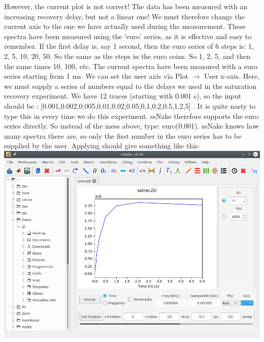 \documentclass[11pt,a4paper]{article}
\begin{document}
However, the  current plot is not correct! The data has been measured with an increasing recovery
delay, but not a linear one! We must therefore change the current axis to the one we have actually
used during the measurement. These spectra have been measured using the `euro' series, as it is
effective and easy to remember. If the first delay is, say 1 second, then the euro series of 6 steps
is: 1, 2, 5, 10, 20, 50. So the same as the steps in the euro coins. So 1, 2, 5, and then the same
times 10, 100, etc. The current spectra have been measured with a euro series starting from 1 ms. We
can set the user axis via Plot $\rightarrow$ User x-axis. Here, we must supply a series of numbers
equal to the delays we used in the saturation recovery experiment. We have 12 traces (starting with
0.001 s), so the input should be : [0.001,0.002,0.005,0.01,0.02,0.05,0.1,0.2,0.5,1,2,5] . It is
quite nasty to type this in every time we do this experiment. ssNake therefore supports the euro
series directly. So instead of the mess above, type: euro(0.001). ssNake knows how many spectra
there are, so only the first number in the euro series has to be supplied by the user. Applying
should give something like this:\\ \includegraphics[width=\linewidth]{Images/T1correctAxis.png}
\end{document}
